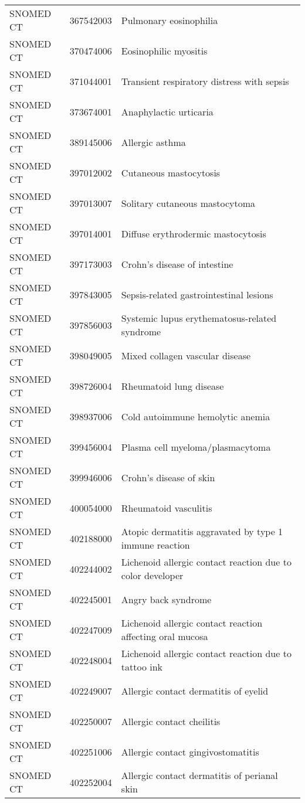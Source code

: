 \begin{longtable}{p{}p{}p{}}
  SNOMED CT & 367542003 & Pulmonary eosinophilia \\ 
  SNOMED CT & 370474006 & Eosinophilic myositis \\ 
  SNOMED CT & 371044001 & Transient respiratory distress with sepsis \\ 
  SNOMED CT & 373674001 & Anaphylactic urticaria \\ 
  SNOMED CT & 389145006 & Allergic asthma \\ 
  SNOMED CT & 397012002 & Cutaneous mastocytosis \\ 
  SNOMED CT & 397013007 & Solitary cutaneous mastocytoma \\ 
  SNOMED CT & 397014001 & Diffuse erythrodermic mastocytosis \\ 
  SNOMED CT & 397173003 & Crohn's disease of intestine \\ 
  SNOMED CT & 397843005 & Sepsis-related gastrointestinal lesions \\ 
  SNOMED CT & 397856003 & Systemic lupus erythematosus-related syndrome \\ 
  SNOMED CT & 398049005 & Mixed collagen vascular disease \\ 
  SNOMED CT & 398726004 & Rheumatoid lung disease \\ 
  SNOMED CT & 398937006 & Cold autoimmune hemolytic anemia \\ 
  SNOMED CT & 399456004 & Plasma cell myeloma/plasmacytoma \\ 
  SNOMED CT & 399946006 & Crohn's disease of skin \\ 
  SNOMED CT & 400054000 & Rheumatoid vasculitis \\ 
  SNOMED CT & 402188000 & Atopic dermatitis aggravated by type 1 immune reaction \\ 
  SNOMED CT & 402244002 & Lichenoid allergic contact reaction due to color developer \\ 
  SNOMED CT & 402245001 & Angry back syndrome \\ 
  SNOMED CT & 402247009 & Lichenoid allergic contact reaction affecting oral mucosa \\ 
  SNOMED CT & 402248004 & Lichenoid allergic contact reaction due to tattoo ink \\ 
  SNOMED CT & 402249007 & Allergic contact dermatitis of eyelid \\ 
  SNOMED CT & 402250007 & Allergic contact cheilitis \\ 
  SNOMED CT & 402251006 & Allergic contact gingivostomatitis \\ 
  SNOMED CT & 402252004 & Allergic contact dermatitis of perianal skin \\ 

\end{longtable}
